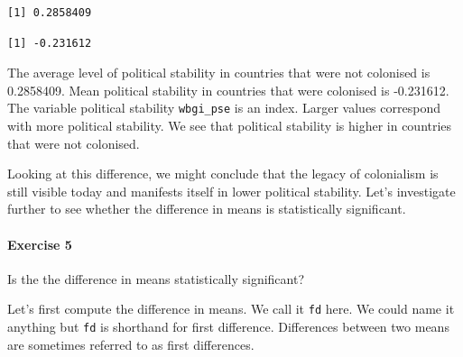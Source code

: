 \documentclass[]{article}
\newenvironment{Shaded}{\begin{snugshade}}{\end{snugshade}}
\newcommand{\KeywordTok}[1]{\textcolor[rgb]{0.13,0.29,0.53}{\textbf{#1}}}
\newcommand{\StringTok}[1]{\textcolor[rgb]{0.31,0.60,0.02}{#1}}
\newcommand{\CommentTok}[1]{\textcolor[rgb]{0.56,0.35,0.01}{\textit{#1}}}
\newcommand{\OperatorTok}[1]{\textcolor[rgb]{0.81,0.36,0.00}{\textbf{#1}}}
\newcommand{\NormalTok}[1]{#1}
\let\oldparagraph\paragraph
\renewcommand{\paragraph}[1]{\oldparagraph{#1}\mbox{}}
\theoremstyle{definition}
\theoremstyle{definition}
\theoremstyle{definition}
\theoremstyle{remark}
\begin{document}
\begin{verbatim}
[1] 0.2858409
\end{verbatim}

\begin{Shaded}
\end{Shaded}

\begin{verbatim}
[1] -0.231612
\end{verbatim}

The average level of political stability in countries that were not
colonised is 0.2858409. Mean political stability in countries that were
colonised is -0.231612. The variable political stability
\texttt{wbgi\_pse} is an index. Larger values correspond with more
political stability. We see that political stability is higher in
countries that were not colonised.

Looking at this difference, we might conclude that the legacy of
colonialism is still visible today and manifests itself in lower
political stability. Let's investigate further to see whether the
difference in means is statistically significant.

\paragraph{Exercise 5}\label{exercise-5-3}

Is the the difference in means statistically significant?

Let's first compute the difference in means. We call it \texttt{fd}
here. We could name it anything but \texttt{fd} is shorthand for first
difference. Differences between two means are sometimes referred to as
first differences.

\begin{Shaded}
\end{Shaded}
\end{document}
